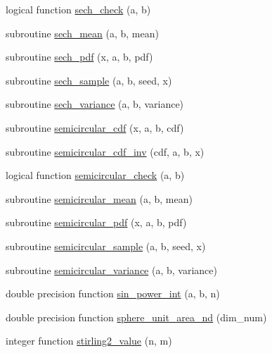 \begin{DoxyCompactItemize}
\item 
logical function \hyperlink{_bhabha__fortran__sem__doxy_8f_aaa8b88a5a18965765dd105f35f27334e}{sech\+\_\+check} (a, b)
\item 
subroutine \hyperlink{_bhabha__fortran__sem__doxy_8f_a3883c0db4be7be699a5beeed32adb504}{sech\+\_\+mean} (a, b, mean)
\item 
subroutine \hyperlink{_bhabha__fortran__sem__doxy_8f_a688a7b361741dad3d269d8081b912f76}{sech\+\_\+pdf} (x, a, b, pdf)
\item 
subroutine \hyperlink{_bhabha__fortran__sem__doxy_8f_a3b87004baabafee7ad7ec925d02fbffa}{sech\+\_\+sample} (a, b, seed, x)
\item 
subroutine \hyperlink{_bhabha__fortran__sem__doxy_8f_a2520eac72066583e24fc121018b6ba2e}{sech\+\_\+variance} (a, b, variance)
\item 
subroutine \hyperlink{_bhabha__fortran__sem__doxy_8f_a4bd980f50e41d09ed86abca21d3dfa14}{semicircular\+\_\+cdf} (x, a, b, cdf)
\item 
subroutine \hyperlink{_bhabha__fortran__sem__doxy_8f_a6d0ee2a8130e550cd689cd255ccc60cc}{semicircular\+\_\+cdf\+\_\+inv} (cdf, a, b, x)
\item 
logical function \hyperlink{_bhabha__fortran__sem__doxy_8f_a7190d7f0fbac6430ec693e54dc1aa636}{semicircular\+\_\+check} (a, b)
\item 
subroutine \hyperlink{_bhabha__fortran__sem__doxy_8f_ad13798246f26b503c71d03dc1397d510}{semicircular\+\_\+mean} (a, b, mean)
\item 
subroutine \hyperlink{_bhabha__fortran__sem__doxy_8f_a9f8895094b6821e14853bae849297fca}{semicircular\+\_\+pdf} (x, a, b, pdf)
\item 
subroutine \hyperlink{_bhabha__fortran__sem__doxy_8f_ab458959d3e85a81b418a1e703fda7ce7}{semicircular\+\_\+sample} (a, b, seed, x)
\item 
subroutine \hyperlink{_bhabha__fortran__sem__doxy_8f_a01f045ae1d9d3cb85e0de3e1d207f5f9}{semicircular\+\_\+variance} (a, b, variance)
\item 
double precision function \hyperlink{_bhabha__fortran__sem__doxy_8f_a11b103a7500f33e4679f27dcc250d7eb}{sin\+\_\+power\+\_\+int} (a, b, n)
\item 
double precision function \hyperlink{_bhabha__fortran__sem__doxy_8f_aaa5d69bd35accf7257e983f76d12cb87}{sphere\+\_\+unit\+\_\+area\+\_\+nd} (dim\+\_\+num)
\item 
integer function \hyperlink{_bhabha__fortran__sem__doxy_8f_a917c5cb6942b4f683a70b827c88476bd}{stirling2\+\_\+value} (n, m)

\end{DoxyCompactItemize}
